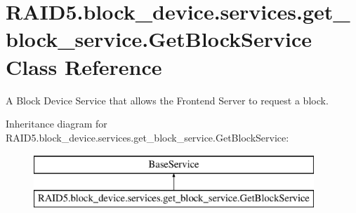 \hypertarget{class_r_a_i_d5_1_1block__device_1_1services_1_1get__block__service_1_1_get_block_service}{}\section{R\+A\+I\+D5.\+block\+\_\+device.\+services.\+get\+\_\+block\+\_\+service.\+Get\+Block\+Service Class Reference}
\label{class_r_a_i_d5_1_1block__device_1_1services_1_1get__block__service_1_1_get_block_service}


A Block Device Service that allows the Frontend Server to request a block.  


Inheritance diagram for R\+A\+I\+D5.\+block\+\_\+device.\+services.\+get\+\_\+block\+\_\+service.\+Get\+Block\+Service\+:\begin{figure}[H]
\begin{center}
\leavevmode
\includegraphics[height=2.000000cm]{class_r_a_i_d5_1_1block__device_1_1services_1_1get__block__service_1_1_get_block_service}
\end{center}
\end{figure}
